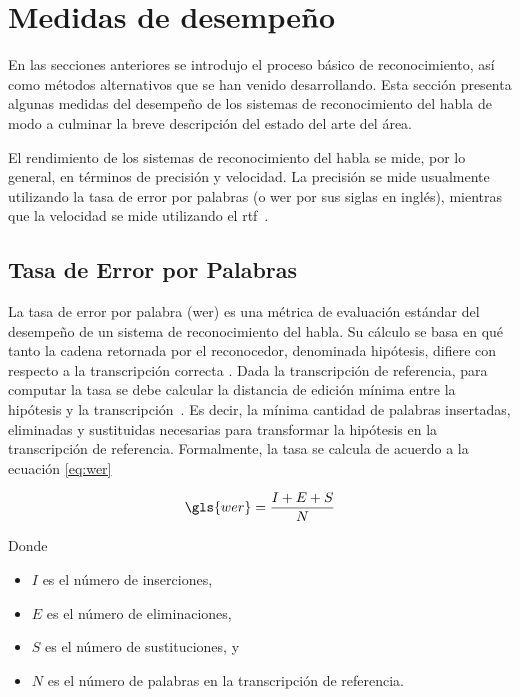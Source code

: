\section{Medidas de desempe\~no}
\label{sec:medidas-desempenho}

En las secciones anteriores se introdujo el proceso b\'asico de reconocimiento, as\'i como m\'etodos
alternativos que se han venido desarrollando. Esta secci\'on presenta algunas medidas del desempe\~no 
de los sistemas de reconocimiento del habla de modo a culminar la breve descripci\'on del estado del arte del \'area.

El rendimiento de los sistemas de reconocimiento del habla se mide, por lo general, en t\'erminos
de precisi\'on y velocidad. La precisi\'on se mide usualmente utilizando la tasa de error por palabras
(o \gls{wer} por sus siglas en ingl\'es), mientras que la velocidad se mide utilizando el 
\mbox{\gls{rtf} \cite{GaikwadAReview2010}.}

\subsection{Tasa de Error por Palabras}
\label{sec:wer}

La tasa de error por palabra (\gls{wer}) es una m\'etrica de evaluaci\'on est\'andar del desempe\~no de un sistema de
reconocimiento del habla. Su c\'alculo se basa en qu\'e tanto la cadena retornada por el reconocedor,
denominada hip\'otesis, difiere con respecto a la transcripci\'on correcta \cite{Jurafsky}. 
Dada la transcripci\'on de referencia, para computar la tasa se debe calcular la distancia de edici\'on m\'inima
entre la hip\'otesis y la \mbox{transcripci\'on \cite{GaikwadAReview2010}}. Es decir, la m\'inima cantidad 
de palabras insertadas, eliminadas y sustituidas necesarias para transformar la hipótesis en la 
transcripción de referencia. Formalmente, la tasa se calcula de acuerdo a la ecuaci\'on \eqref{eq:wer}

\begin{equation}
\label{eq:wer}
    \gls{wer} = \frac{I + E + S}{N} 
\end{equation}

Donde

\begin{itemize}
    \item $I$ es el n\'umero de inserciones,
    \item $E$ es el n\'umero de eliminaciones,
    \item $S$ es el n\'umero de sustituciones, y
    \item $N$ es el n\'umero de palabras en la transcripci\'on de referencia.
\end{itemize}

